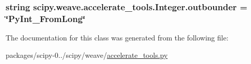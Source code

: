 \subsubsection[{outbounder}]{\setlength{\rightskip}{0pt plus 5cm}string scipy.\+weave.\+accelerate\+\_\+tools.\+Integer.\+outbounder = \char`\"{}Py\+Int\+\_\+\+From\+Long\char`\"{}\hspace{0.3cm}{\ttfamily [static]}}\label{classscipy_1_1weave_1_1accelerate__tools_1_1Integer_a1f20c323905c4888b2441496b6526703}


The documentation for this class was generated from the following file\+:\begin{DoxyCompactItemize}
\item 
packages/scipy-\/0../scipy/weave/\hyperlink{accelerate__tools_8py}{accelerate\+\_\+tools.\+py}\end{DoxyCompactItemize}
